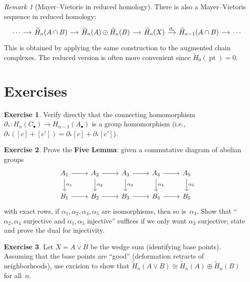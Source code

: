 \documentclass[12pt,a4paper,openany]{book}
\theoremstyle{definition}
\newtheorem{exercise}{Exercise}[chapter]
\theoremstyle{plain}
\theoremstyle{remark}
\newtheorem{remark}[definition]{Remark}
\begin{document}
\begin{remark}[Mayer--Vietoris in reduced homology]\label{rem:mv-reduced}
There is also a Mayer--Vietoris sequence in reduced homology:
\[
\begin{tikzcd}[column sep=1.2em]
  \cdots \ar[r]
  & \widetilde{H}_n(A\cap B) \ar[r]
  & \widetilde{H}_n(A)\oplus\widetilde{H}_n(B) \ar[r]
  & \widetilde{H}_n(X) \ar[r,"\partial_*"]
  & \widetilde{H}_{n-1}(A\cap B) \ar[r]
  & \cdots
\end{tikzcd}
\]
This is obtained by applying the same construction to the augmented chain
complexes.  The reduced version is often more convenient since
$\widetilde{H}_0(\operatorname{pt})=0$.
\end{remark}

\section{Exercises}\label{sec:ex-ch6}

\begin{exercise}\label{exo:connecting-hom-check}
Verify directly that the connecting homomorphism
$\partial_*\colon H_n(C_\bullet)\to H_{n-1}(A_\bullet)$
is a group homomorphism (i.e., $\partial_*([c]+[c'])=\partial_*[c]+\partial_*[c']$).
\end{exercise}

\begin{exercise}\label{exo:five-lemma}
Prove the \textbf{Five Lemma}: given a commutative diagram of abelian groups
\[
\begin{tikzcd}
  A_1 \ar[r] \ar[d,"\alpha_1"] & A_2 \ar[r] \ar[d,"\alpha_2"]
  & A_3 \ar[r] \ar[d,"\alpha_3"] & A_4 \ar[r] \ar[d,"\alpha_4"]
  & A_5 \ar[d,"\alpha_5"] \\
  B_1 \ar[r] & B_2 \ar[r] & B_3 \ar[r] & B_4 \ar[r] & B_5
\end{tikzcd}
\]
with exact rows, if $\alpha_1,\alpha_2,\alpha_4,\alpha_5$ are isomorphisms,
then so is~$\alpha_3$.  Show that ``$\alpha_2,\alpha_4$ surjective and
$\alpha_1,\alpha_5$ injective'' suffices if we only want $\alpha_3$
surjective; state and prove the dual for injectivity.
\end{exercise}

\begin{exercise}\label{exo:excision-wedge}
Let $X=A\vee B$ be the wedge sum (identifying base points).  Assuming
that the base points are ``good'' (deformation retracts of neighborhoods),
use excision to show that
$\widetilde{H}_n(A\vee B)\cong\widetilde{H}_n(A)\oplus\widetilde{H}_n(B)$
for all~$n$.
\end{exercise}
\end{document}
